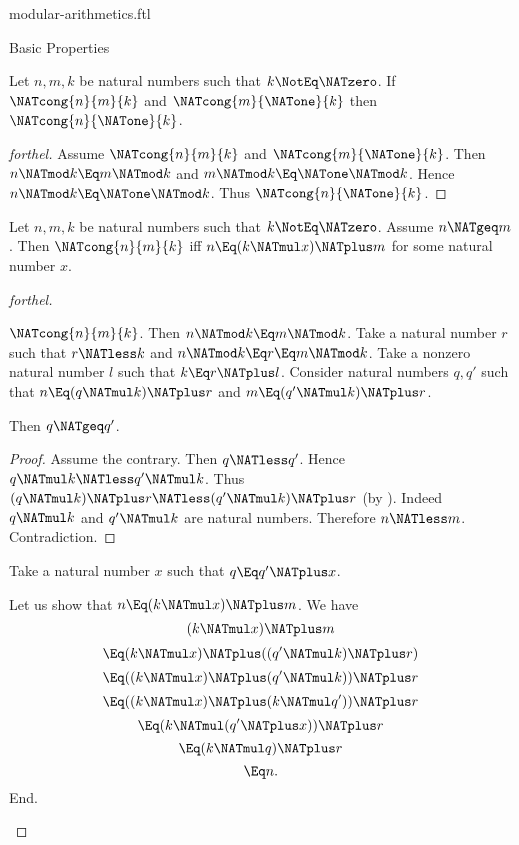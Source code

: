 \documentclass{stex}
\begin{document}
\begin{smodule}{modular-arithmetics.ftl}
\begin{sfragment}{Basic Properties}
  \begin{proposition}[forthel,id=ARITHMETIC_08_7464329746055168]
    Let $n, m, k$ be natural numbers such that $k \NotEq \NATzero$.
    If $\NATcong{n}{m}{k}$ and $\NATcong{m}{\NATone}{k}$ then $\NATcong{n}{\NATone}{k}$.
  \end{proposition}
  \begin{proof}[forthel]
    Assume $\NATcong{n}{m}{k}$ and $\NATcong{m}{\NATone}{k}$.
    Then $n \NATmod k \Eq m \NATmod k$ and $m \NATmod k \Eq \NATone \NATmod k$.
    Hence $n \NATmod k \Eq \NATone \NATmod k$.
    Thus $\NATcong{n}{\NATone}{k}$.
  \end{proof}

  \begin{proposition}[forthel,id=ARITHMETIC_08_2034122983735296]
    Let $n, m, k$ be natural numbers such that $k \NotEq \NATzero$.
    Assume $n \NATgeq m$.
    Then $\NATcong{n}{m}{k}$ iff $n \Eq (k \NATmul x) \NATplus m$ for some natural number $x$.
  \end{proposition}
  \begin{proof}[forthel]
    \begin{case}{$\NATcong{n}{m}{k}$.}
      Then $n \NATmod k \Eq m \NATmod k$.
      Take a natural number $r$ such that $r \NATless k$ and $n \NATmod k \Eq r \Eq m \NATmod k$.
      Take a nonzero natural number $l$ such that $k \Eq r \NATplus l$.
      Consider natural numbers $q,q'$ such that $n \Eq (q \NATmul k) \NATplus r$ and $m \Eq (q' \NATmul k) \NATplus r$.

      Then $q \NATgeq q'$.
      \begin{proof}
        Assume the contrary.
        Then $q \NATless q'$.
        Hence $q \NATmul k \NATless q' \NATmul k$.
        Thus $(q \NATmul k) \NATplus r \NATless (q' \NATmul k) \NATplus r$ (by ).
        Indeed $q \NATmul k$ and $q' \NATmul k$ are natural numbers.
        Therefore $n \NATless m$.
        Contradiction.
      \end{proof}

      Take a natural number $x$ such that $q \Eq q' \NATplus x$.

      Let us show that $n \Eq (k \NATmul x) \NATplus m$.
        We have
        \[  (k \NATmul x) \NATplus m                       \]
        \[    \Eq (k \NATmul x) \NATplus ((q' \NATmul k) \NATplus r)  \]
        \[    \Eq ((k \NATmul x) \NATplus (q' \NATmul k)) \NATplus r  \]
        \[    \Eq ((k \NATmul x) \NATplus (k \NATmul q')) \NATplus r  \]
        \[    \Eq (k \NATmul (q' \NATplus x)) \NATplus r            \]
        \[    \Eq (k \NATmul q) \NATplus r                   \]
        \[    \Eq n.                                \]
      End.
    \end{case}


\end{proof}
\end{sfragment}
\end{smodule}
\end{document}
